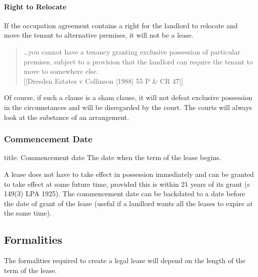 \documentclass[
]{article}
\newenvironment{Shaded}{}{}
\newcommand{\NormalTok}[1]{#1}
\begin{document}
\hypertarget{right-to-relocate}{%
\paragraph{Right to Relocate}\label{right-to-relocate}}

If the occupation agreement contains a right for the landlord to
relocate and move the tenant to alternative premises, it will not be a
lease.

\begin{quote}
\ldots you cannot have a tenancy granting exclusive possession of
particular premises, subject to a provision that the landlord can
require the tenant to move to somewhere else.\\
{[}{[}Dresden Estates v Collinson {[}1988{]} 55 P \& CR 47{]}{]}
\end{quote}

Of course, if such a clause is a sham clause, it will not defeat
exclusive possession in the circumstances and will be disregarded by the
court. The courts will always look at the substance of an arrangement.

\hypertarget{commencement-date}{%
\subsubsection{Commencement Date}\label{commencement-date}}

\begin{Shaded}
\begin{Highlighting}[]
\NormalTok{title: Commencement date}
\NormalTok{The date when the term of the lease begins. }
\end{Highlighting}
\end{Shaded}

A lease does not have to take effect in possession immediately and can
be granted to take effect at some future time, provided this is within
21 years of its grant (s 149(3) LPA 1925). The commencement date can be
backdated to a date before the date of grant of the lease (useful if a
landlord wants all the leases to expire at the same time).

\hypertarget{formalities}{%
\subsection{Formalities}\label{formalities}}

The formalities required to create a legal lease will depend on the
length of the term of the lease.
\end{document}
